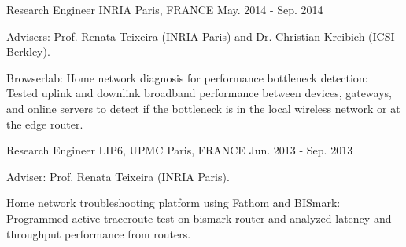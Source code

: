 \begin{cventries}
{\begin{cvitems}
      \end{cvitems}
    }

  \cventry
    {Research Engineer} %
    {INRIA} %
    {Paris, FRANCE} %
    {May. 2014 - Sep. 2014} %
    {
      \begin{cvitems} %
      \item {Advisers: Prof. Renata Teixeira (INRIA Paris) and Dr. Christian Kreibich (ICSI Berkley).}
%      
      \item {Browserlab: Home network diagnosis for performance bottleneck detection: Tested uplink and downlink broadband performance between devices, gateways, and online servers to detect if the bottleneck is in the local wireless network or at the edge router.}
%      
      \end{cvitems}
    }
    
  \cventry
    {Research Engineer} %
    {LIP6, UPMC} %
    {Paris, FRANCE} %
    {Jun. 2013 - Sep. 2013} %
    {
      \begin{cvitems} %
      \item {Adviser: Prof. Renata Teixeira (INRIA Paris).}
%      
      \item {Home network troubleshooting platform using Fathom and BISmark: Programmed active traceroute test on bismark router and analyzed latency and throughput performance from routers.}
%      
      \end{cvitems}
    }


\end{cventries}
